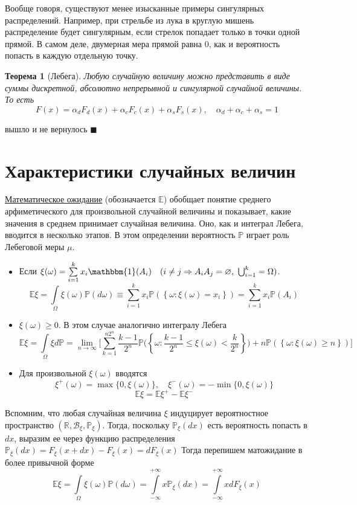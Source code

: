 \documentclass[12pt]{article}
\newtheorem{Th}{Теорема}
\newenvironment{Proof}{\par\noindent{\bf Доказательство}}{$\blacksquare$}
\numberwithin{Th}{section}
\numberwithin{Def}{section}
\numberwithin{Lem}{section}
\numberwithin{St}{section}
\numberwithin{equation}{section}
\newcommand\Set[2]{\left\{ #1 \colon #2 \right\}}
\newcommand\Pro{\mathbb{P}} %
\newcommand\Bor{\mathscr{B}} %
\newcommand\Real{\mathbb{R}} %
\newcommand\Expec{\mathbb{E}} %
\newcommand\Ind{\mathbbm{1}} %
\begin{document}
Вообще говоря, существуют менее изысканные примеры сингулярных распределений. Например, при стрельбе из лука в круглую мишень распределение будет сингулярным,
если стрелок попадает только в точки одной прямой. В самом деле, двумерная мера прямой равна 0, как и вероятность попасть в каждую отдельную точку. 

\begin{Th} [Лебега]
	Любую случайную величину можно представить в виде суммы дискретной, абсолютно непрерывной и сингулярной случайной величины. То есть 
	$$ F(x) = \alpha_dF_d(x) + \alpha_cF_c(x) + \alpha_sF_s(x), \quad \alpha_d + \alpha_c + \alpha_s = 1$$
\end{Th}
\begin{Proof}
вышло и не вернулось
\end{Proof}

\newpage
\section{Характеристики случайных величин}

\underline{Математическое ожидание} (обозначается $\Expec$) обобщает понятие среднего арфиметического для произвольной случайной величины и показывает, какие значения в среднем принимает случайная величина. Оно, как и интеграл Лебега, вводится в несколько этапов. В этом определении вероятность $\Pro$ играет роль
Лебеговой меры $\mu$.

\begin{itemize}
 	\item Если $\xi(\omega) = \sum\limits_{i=1}^kx_i \Ind(A_i) \quad (i \not= j \Rightarrow A_iA_j = \varnothing, \ \bigcup_{i=1}^k = \Omega)$. 
 	$$\Expec \xi = \int\limits_{\Omega} \xi(\omega) \Pro(d\omega) \equiv \sum\limits_{i=1}^k x_i \Pro(\Set{\omega}{\xi(\omega)=x_i}) =  \sum\limits_{i=1}^k x_i \Pro(A_i)$$
	\item $\xi(\omega) \ge 0$. В этом случае аналогично интегралу Лебега
	$$ \Expec \xi = \int\limits_{\Omega} \xi d\Pro = \lim_{n \to \infty}  \biggl[  \sum\limits_{k=1}^{n2^n} \frac{k-1}{2^n} \Pro\biggl(\Set{\omega}{\frac{k-1}{2^n} \le \xi(\omega) < \frac{k}{2^n}}\biggl) 
	+ n \Pro(\Set{\omega}{\xi(\omega) \ge n})\biggl]$$
	\item Для произвольной $\xi(\omega)$ вводятся
	$$ \xi^+(\omega) = \max\{0, \xi(\omega)\},\quad \xi^-(\omega) = -\min\{0, \xi(\omega)\}$$
	$$ \Expec \xi = \Expec \xi^+ - \Expec \xi^-$$
\end{itemize}

Вспомним, что любая случайная величина $\xi$ индуцирует вероятностное пространство $(\Real, \Bor_\xi, \Pro_\xi)$. Тогда, поскольку $\Pro_\xi(dx)$ есть вероятность попасть
в $dx$, выразим ее через функцию распределения $\Pro_\xi(dx) = F_\xi(x + dx) - F_\xi(x) = dF_\xi(x)$ Тогда перепишем матожидание в более привычной форме
$$\Expec\xi = \int\limits_{\Omega} \xi(\omega) \Pro(d\omega) = \int\limits_{-\infty}^{+\infty} x \Pro_\xi(dx) = \int\limits_{-\infty}^{+\infty} x dF_\xi(x)$$
\end{document}
